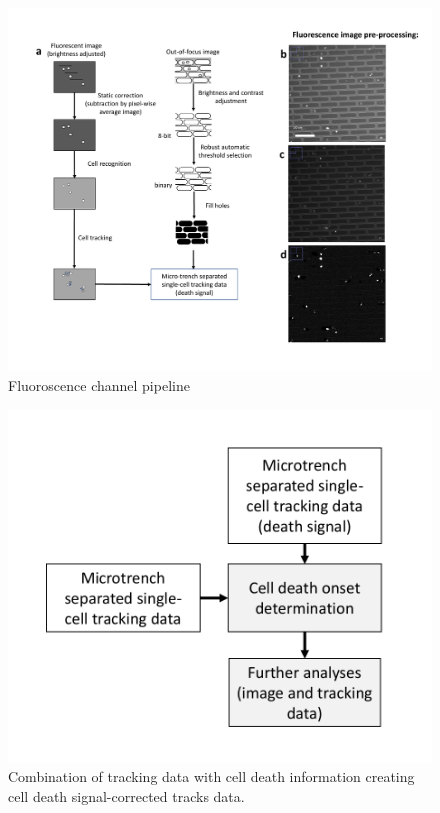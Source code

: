 \documentclass[pdftex,12pt,a4paper]{report}
\begin{document}
\begin{landscape}
\begin{figure}[H]
   \centering
    \includegraphics[height=\textheight]{images/pipeline/02.pdf}
    \caption[Fluoroscence channel pipeline]{Fluoroscence channel pipeline}
\end{figure}
\label{fig:pipeline2}
\end{landscape}

\begin{figure}[H]
   \centering
    \includegraphics[height=0.5\textwidth]{images/pipeline/03.pdf}
    \caption[Combination of tracking data with cell death information creating cell death signal-corrected tracks data]{Combination of tracking data with cell death information creating cell death signal-corrected tracks data.}
    \label{fig:pipeline3}
\end{figure}
\end{document}
